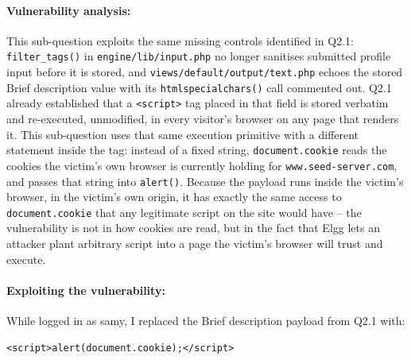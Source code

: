 


\dranswer

\paragraph{Vulnerability analysis:} This sub-question exploits the same missing controls identified in Q2.1: \texttt{filter\_tags()} in \texttt{engine/lib/input.php} no longer sanitises submitted profile input before it is stored, and \texttt{views/default/output/text.php} echoes the stored Brief description value with its \texttt{htmlspecialchars()} call commented out. Q2.1 already established that a \texttt{<script>} tag placed in that field is stored verbatim and re-executed, unmodified, in every visitor's browser on any page that renders it. This sub-question uses that same execution primitive with a different statement inside the tag: instead of a fixed string, \texttt{document.cookie} reads the cookies the victim's own browser is currently holding for \texttt{www.seed-server.com}, and passes that string into \texttt{alert()}. Because the payload runs inside the victim's browser, in the victim's own origin, it has exactly the same access to \texttt{document.cookie} that any legitimate script on the site would have -- the vulnerability is not in how cookies are read, but in the fact that Elgg lets an attacker plant arbitrary script into a page the victim's browser will trust and execute.

\paragraph{Exploiting the vulnerability:} While logged in as samy, I replaced the Brief description payload from Q2.1 with:

\begin{lstlisting}
<script>alert(document.cookie);</script>
\end{lstlisting}

